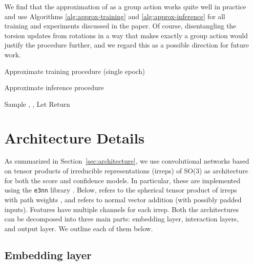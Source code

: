 \documentclass{article} \usepackage{iclr2023_conference,times}
\begin{document}
We find that the approximation of  as a group action works quite well in practice and use Algorithms \ref{alg:approx-training} and \ref{alg:approx-inference} for all training and experiments discussed in the paper. Of course, disentangling the torsion updates from rotations in a way that makes  exactly a group action would justify the procedure further, and we regard this as a possible direction for future work.

\begin{algorithm}[h]
\caption{Approximate training procedure (single epoch)}\label{alg:approx-training}
\end{algorithm}

\begin{algorithm}[h]
\caption{Approximate inference procedure}\label{alg:approx-inference}
Sample , , \;
Let \;
Return \;
\end{algorithm}



\section{Architecture Details} \label{app:architecture}

As summarized in Section~\ref{sec:architecture}, we use convolutional networks based on tensor products of irreducible representations (irreps) of SO(3) \citep{thomas2018tensor} as architecture for both the score and confidence models. In particular, these are implemented using the \verb|e3nn| library \citep{e3nn}. Below,  refers to the spherical tensor product of irreps with path weights , and  refers to normal vector addition (with possibly padded inputs). Features have multiple channels for each irrep.
Both the architectures can be decomposed into three main parts: embedding layer, interaction layers, and output layer. We outline each of them below.

\subsection{Embedding layer}
\end{document}

